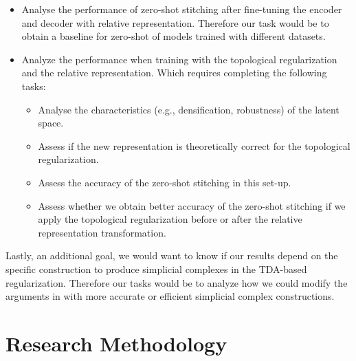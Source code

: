 \documentclass[../main.tex]{subfiles}
\begin{document}
\begin{itemize}
    \item Analyse the performance of zero-shot stitching after fine-tuning the encoder and decoder with relative representation. Therefore our task would be to obtain a baseline for zero-shot of models trained with different datasets.
    
    \item Analyze the performance when training with the topological regularization and the relative representation. Which requires completing the following tasks:

    \begin{itemize}
         \item Analyse the characteristics (e.g., densification, robustness) of the latent space.
         
        \item Assess if the new representation is theoretically correct for the topological regularization.
        
        \item Assess the accuracy of the zero-shot stitching in this set-up.

        \item Assess whether we obtain better accuracy of the zero-shot stitching if we apply the topological regularization before or after the relative representation transformation.
        
    \end{itemize}
\end{itemize}

Lastly, an additional goal, we would want to know if our results depend on the specific construction to produce simplicial complexes in the TDA-based regularization. Therefore our tasks would be to analyze how we could  modify the arguments in \cite{hofer_densified_2021} with more accurate or efficient simplicial complex constructions. 


\section{Research Methodology}
\end{document}
